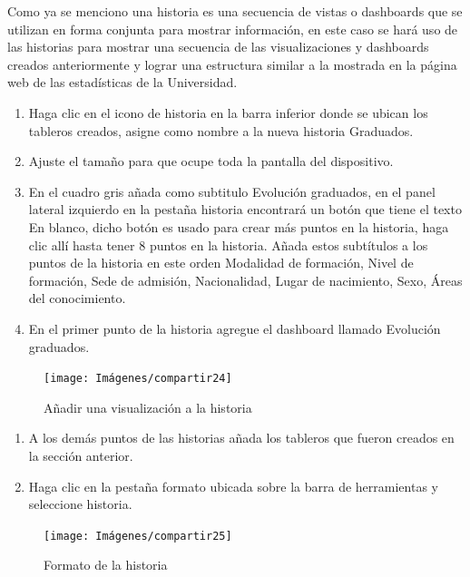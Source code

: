 \documentclass[
]{book}
\begin{document}
Como ya se menciono una historia es una secuencia de vistas o dashboards que se utilizan en forma conjunta para mostrar información, en este caso se hará uso de las historias para mostrar una secuencia de las visualizaciones y dashboards creados anteriormente y lograr una estructura similar a la mostrada en la página web de las estadísticas de la Universidad.

\begin{enumerate}
\def\labelenumi{\arabic{enumi}.}
\item
  Haga clic en el icono de historia en la barra inferior donde se ubican los tableros creados, asigne como nombre a la nueva historia Graduados.
\item
  Ajuste el tamaño para que ocupe toda la pantalla del dispositivo.
\item
  En el cuadro gris añada como subtitulo Evolución graduados, en el panel lateral izquierdo en la pestaña historia encontrará un botón que tiene el texto En blanco, dicho botón es usado para crear más puntos en la historia, haga clic allí hasta tener \(8\) puntos en la historia. Añada estos subtítulos a los puntos de la historia en este orden Modalidad de formación, Nivel de formación, Sede de admisión, Nacionalidad, Lugar de nacimiento, Sexo, Áreas del conocimiento.
\item
  En el primer punto de la historia agregue el dashboard llamado Evolución graduados.
\end{enumerate}

\begin{figure}

{\centering \texttt{[image: Imágenes/compartir24]} 

}

\caption{Añadir una visualización a la historia}\label{fig:paso4compartir-fig}
\end{figure}

\begin{enumerate}
\def\labelenumi{\arabic{enumi}.}
\setcounter{enumi}{4}
\item
  A los demás puntos de las historias añada los tableros que fueron creados en la sección anterior.
\item
  Haga clic en la pestaña formato ubicada sobre la barra de herramientas y seleccione historia.
\end{enumerate}

\begin{figure}

{\centering \texttt{[image: Imágenes/compartir25]} 

}

\caption{Formato de la historia}\label{fig:paso6compartir-fig}
\end{figure}
\end{document}
